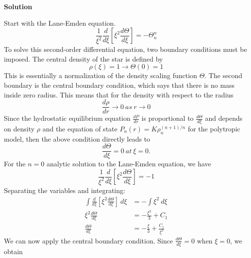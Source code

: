 \documentclass[12pt]{article}
\begin{document}
\setcounter{equation}{0}
\vspace{0.5cm}
\begin{adjustwidth}{2.5em}{0pt}
\begin{siderules}
 {\color{blue} \textbf{Solution}
 
Start with the Lane-Emden equation.
\begin{equation*}
\frac{1}{\xi^2}\frac{d}{d\xi}\left[\xi^2 \frac{d\Theta}{d\xi}\right] = -\Theta_n^n
\end{equation*}
To solve this second-order differential equation, two boundary conditions must be imposed. The central density of the star is defined by
\begin{equation}
\rho(\xi) = 1 \rightarrow \Theta(0) = 1
\end{equation}
This is essentially a normalization of the density scaling function $\Theta$. The second boundary is the central boundary condition, which says that there is no mass inside zero radius. This means that for the density with respect to the radius
\begin{equation}
\frac{d\rho}{dr} \rightarrow 0 ~as ~ r \rightarrow 0
\end{equation}
Since the hydrostatic equilibrium equation $\frac{dP}{dr}$ is proportional to $\frac{d\Theta}{d\xi}$ and depends on density $\rho$ and the equation of state $P_n (r) = K\rho_n^{(n+1)/n}$ for the polytropic model, then the above condition directly leads to
\begin{equation}
\frac{d\Theta}{d\xi} = 0 ~at ~ \xi = 0.
\end{equation}
For the $n=0$ analytic solution to the Lane-Emden equation, we have
\begin{equation}
\frac{1}{\xi^2}\frac{d}{d\xi}\left[\xi^2 \frac{d\Theta}{d\xi}\right] = -1
\end{equation}
Separating the variables and integrating:
\begin{equation}
\begin{aligned}
\int \frac{d}{d\xi} \left[\xi^2 \frac{d\Theta}{d\xi} \right] ~d\xi &= -\int \xi^2 ~d\xi \\
\xi^2 \frac{d\Theta}{d\xi} &= -\frac{\xi^3}{3} + C_1 \\
\frac{d\Theta}{d\xi} &= -\frac{\xi}{3} + \frac{C_1}{\xi^2}
\end{aligned}
\end{equation}
We can now apply the central boundary condition. Since $\frac{d\Theta}{d\xi} = 0$ when $\xi = 0$, we obtain
\begin{equation}
\begin{aligned}

\end{aligned}
\end{equation}}
\end{siderules}
\end{adjustwidth}
\end{document}
